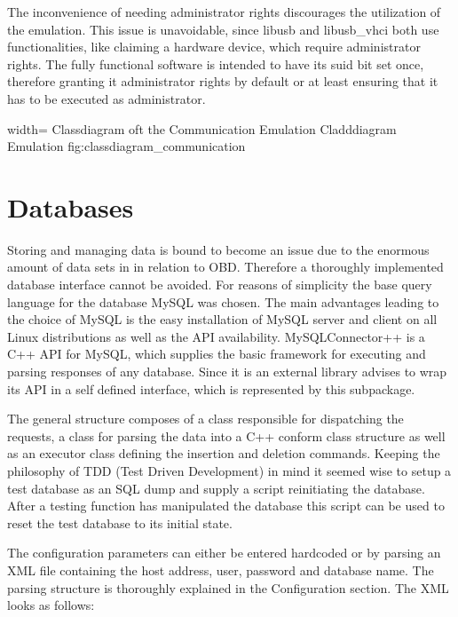 The inconvenience of needing administrator rights discourages the utilization of the emulation. This issue is unavoidable, since libusb and 
libusb\_vhci both use functionalities, like claiming a hardware device, which require administrator rights. The fully functional software is 
intended to have its suid bit set once, therefore granting it administrator rights by default or at least ensuring that it has to be executed 
as administrator.

 {width=\textwidth}%
 {Classdiagram oft the Communication Emulation}%
 {Cladddiagram Emulation}%
 {fig:classdiagram_communication}%

\section{Databases}
\label{sec:database}
Storing and managing data is bound to become an issue due to the enormous amount of data sets in in relation to OBD. Therefore a thoroughly 
implemented database interface cannot be avoided. For reasons of simplicity the base query language for the database MySQL was chosen. The main 
advantages leading to the choice of MySQL is the easy installation of MySQL server and client on all Linux distributions as well as the API 
availability. MySQLConnector++ \cite{MYSQL} is a C++ API for MySQL, which supplies the basic framework for executing and parsing responses of any database. 
Since it is an external library   advises to wrap its API in a self defined interface, which is represented by this subpackage. 

The general structure composes of a class responsible for dispatching the requests, a class for parsing the data into a C++ conform class 
structure as well as an executor class defining the insertion and deletion commands. Keeping the philosophy of TDD (Test Driven Development) 
in mind it seemed wise to setup a test database as an SQL dump and supply a script reinitiating the database. After a testing function has 
manipulated the database this script can be used to reset the test database to its initial state. 

The configuration parameters can either be entered hardcoded or by parsing an XML file containing the host address, user, password and database 
name. The parsing  structure is thoroughly explained in the Configuration section. The XML looks as follows:

